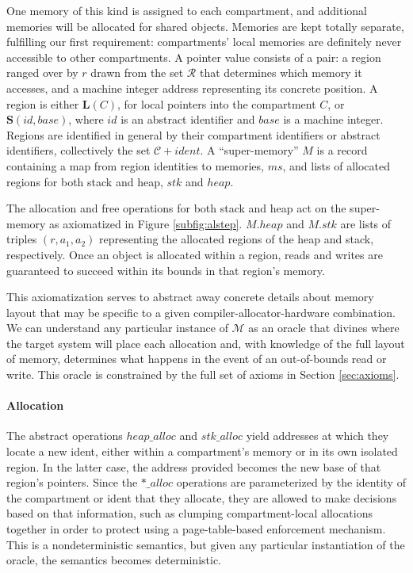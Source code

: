 \documentclass{article}
\begin{document}
One memory of this kind is assigned to each compartment, and additional memories will be
allocated for shared objects. Memories are kept totally separate, fulfilling our first requirement:
compartments' local memories are definitely never accessible to other compartments.
A pointer value consists of a pair: a region ranged over by \(r\) drawn from the set
\(\mathcal{R}\) that determines which memory it accesses, and a machine integer address representing
its concrete position. A region is either \(\mathbf{L}(C)\), for local pointers into
the compartment \(C\), or \(\mathbf{S}(id,\mathit{base})\), where \(id\) is an
abstract identifier and \(\mathit{base}\) is a machine integer. Regions are identified
in general by their compartment identifiers or abstract identifiers, collectively
the set \(\mathcal{C} + \mathit{ident}\). A ``super-memory'' \(M\)
is a record containing a map from region identities to memories, \(ms\),
and lists of allocated regions for both stack and heap, \(stk\) and \(heap\).

The allocation and free operations for both stack and heap act on the super-memory
as axiomatized in Figure \ref{subfig:alstep}.
\(M.heap\) and \(M.stk\) are lists of triples \((r, a_1, a_2)\) representing
the allocated regions of the heap and stack, respectively.
Once an object is allocated within a region, reads and writes are guaranteed to succeed
within its bounds in that region's memory.

This axiomatization serves to abstract away concrete details about memory layout
that may be specific to a given compiler-allocator-hardware combination. We can
understand any particular instance of \(\mathcal{M}\) as an oracle that divines where
the target system will place each allocation and, with knowledge of the full layout of
memory, determines what happens in the event of an out-of-bounds read or write.
This oracle is constrained by the full set of axioms in Section \ref{sec:axioms}.

\paragraph{Allocation}

The abstract operations \(\mathit{heap\_alloc}\) and \(\mathit{stk\_alloc}\)
yield addresses at which they locate a new ident, either within a compartment's memory
or in its own isolated region. In the latter case, the address provided becomes
the new base of that region's pointers. Since the \(\mathit{*\_alloc}\) operations are
parameterized by the identity of the compartment or ident
that they allocate, they are allowed to make decisions based on that
information, such as clumping compartment-local allocations together in order to
protect using a page-table-based enforcement mechanism.
This is a nondeterministic semantics, but given any particular instantiation of
the oracle, the semantics becomes deterministic.
\end{document}
